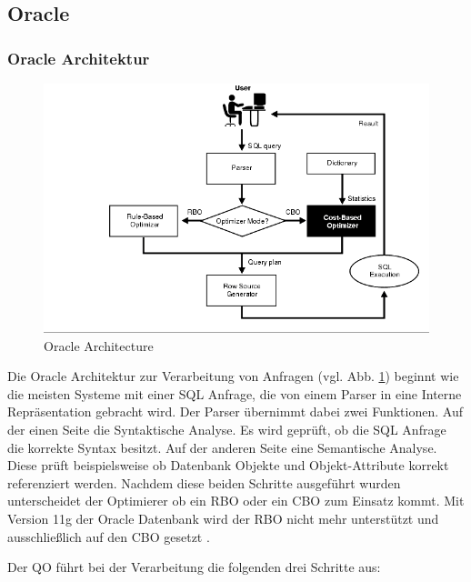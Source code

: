 \subsection{Oracle}
\subsubsection{Oracle Architektur}


\begin{figure}[h]
  \centering
  \includegraphics[width=\textwidth]{03_Related_Work/OracleArchitecture.png}
  \caption{Oracle Architecture \cite{Oracle2004Basics}}
  \label{OracleArchitecture}
\end{figure}



Die Oracle Architektur zur Verarbeitung von Anfragen \cite{Oracle2004Basics} (vgl. Abb. \ref{OracleArchitecture})  beginnt wie die meisten Systeme mit einer SQL Anfrage, die von einem Parser in eine Interne Repräsentation gebracht wird. Der Parser übernimmt dabei zwei Funktionen. Auf der einen Seite die Syntaktische Analyse. Es wird geprüft, ob die SQL Anfrage die korrekte Syntax besitzt. Auf der anderen Seite eine Semantische Analyse. Diese prüft beispielsweise ob Datenbank Objekte und Objekt-Attribute  korrekt referenziert werden. Nachdem diese beiden Schritte ausgeführt wurden unterscheidet der Optimierer ob ein \ac{RBO} oder ein \ac{CBO} zum Einsatz kommt. Mit Version 11g der Oracle Datenbank wird der \ac{RBO} nicht mehr unterstützt und ausschließlich auf den \ac{CBO} gesetzt \cite{dba_oracle2015}.

Der \ac{QO} führt bei der Verarbeitung die folgenden drei Schritte aus:

